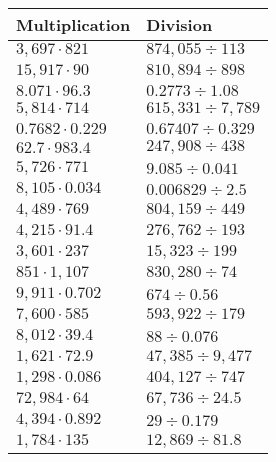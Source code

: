 \begin{longtable}[]{@{}ll@{}}
\toprule
Multiplication & Division\tabularnewline
\midrule
\endhead
\(3,697\cdot821\) & \(874,055÷113\)\tabularnewline
\(15,917\cdot90\) & \(810,894÷898\)\tabularnewline
\(8.071\cdot96.3\) & \(0.2773÷1.08\)\tabularnewline
\(5,814\cdot714\) & \(615,331÷7,789\)\tabularnewline
\(0.7682\cdot0.229\) & \(0.67407÷0.329\)\tabularnewline
\(62.7\cdot983.4\) & \(247,908÷438\)\tabularnewline
\(5,726\cdot771\) & \(9.085÷0.041\)\tabularnewline
\(8,105\cdot0.034\) & \(0.006829÷2.5\)\tabularnewline
\(4,489\cdot769\) & \(804,159÷449\)\tabularnewline
\(4,215\cdot91.4\) & \(276,762÷193\)\tabularnewline
\(3,601\cdot237\) & \(15,323÷199\)\tabularnewline
\(851\cdot1,107\) & \(830,280÷74\)\tabularnewline
\(9,911\cdot0.702\) & \(674÷0.56\)\tabularnewline
\(7,600\cdot585\) & \(593,922÷179\)\tabularnewline
\(8,012\cdot39.4\) & \(88÷0.076\)\tabularnewline
\(1,621\cdot72.9\) & \(47,385÷9,477\)\tabularnewline
\(1,298\cdot0.086\) & \(404,127÷747\)\tabularnewline
\(72,984\cdot64\) & \(67,736÷24.5\)\tabularnewline
\(4,394\cdot0.892\) & \(29÷0.179\)\tabularnewline
\(1,784\cdot135\) & \(12,869÷81.8\)\tabularnewline
\bottomrule
\end{longtable}
